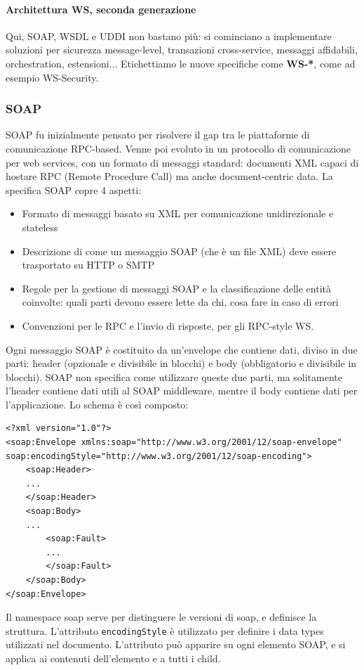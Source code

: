 \documentclass[11pt]{article}
\newcommand{\code}[1]{\texttt{#1}}
\begin{document}
\paragraph{Architettura WS, seconda generazione} Qui, SOAP, WSDL e UDDI non bastano più: si cominciano a implementare soluzioni per sicurezza message-level, transazioni cross-service, messaggi affidabili, orchestration, estensioni... Etichettiamo le nuove specifiche come \textbf{WS-*}, come ad esempio WS-Security. 
\subsubsection{SOAP}
SOAP fu inizialmente pensato per risolvere il gap tra le piattaforme di comunicazione RPC-based. Venne poi evoluto in un protocollo di comunicazione per web services, con un formato di messaggi standard: documenti XML capaci di hostare RPC (Remote Procedure Call) ma anche document-centric data. La specifica SOAP copre 4 aspetti:
\begin{itemize}
    \item Formato di messaggi basato su XML per comunicazione unidirezionale e stateless 
    \item Descrizione di come un messaggio SOAP (che è un file XML) deve essere trasportato su HTTP o SMTP 
    \item Regole per la gestione di messaggi SOAP e la classificazione delle entità coinvolte: quali parti devono essere lette da chi, cosa fare in caso di errori 
    \item Convenzioni per le RPC e l'invio di risposte, per gli RPC-style WS. 
\end{itemize}
Ogni messaggio SOAP è costituito da un'envelope che contiene dati, diviso in due parti: header (opzionale e divisibile in blocchi) e body (obbligatorio e divisibile in blocchi). SOAP non specifica come utilizzare queste due parti, ma solitamente l'header contiene dati utili al SOAP middleware, mentre il body contiene dati per l'applicazione. 
Lo schema è così composto:
\begin{verbatim}
<?xml version="1.0"?>
<soap:Envelope xmlns:soap="http://www.w3.org/2001/12/soap-envelope" 
soap:encodingStyle="http://www.w3.org/2001/12/soap-encoding">
    <soap:Header> 
    ... 
    </soap:Header>
    <soap:Body> 
    ...
        <soap:Fault> 
        ... 
        </soap:Fault>
    </soap:Body>
</soap:Envelope>
\end{verbatim}
Il namespace soap serve per distinguere le versioni di soap, e definisce la struttura. L'attributo \code{encodingStyle} è utilizzato per definire i data types utilizzati nel documento. L'attributo può apparire su ogni elemento SOAP, e si applica ai contenuti dell'elemento e a tutti i child. 
\end{document}
